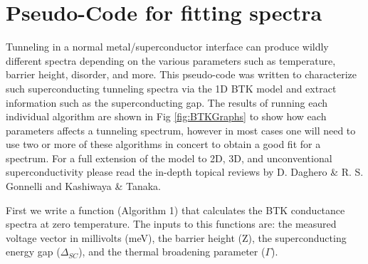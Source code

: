 \section{Pseudo-Code for fitting spectra}
Tunneling in a normal metal/superconductor interface can produce wildly different spectra depending on the various parameters such as temperature, barrier height, disorder, and more. This pseudo-code was written to characterize such superconducting tunneling spectra via the 1D \ac{BTK} model and extract information such as the superconducting gap. The results of running each individual algorithm are shown in Fig \ref{fig:BTKGraphs} to show how each parameters affects a tunneling spectrum, however in most cases one will need to use two or more of these algorithms in concert to obtain a good fit for a spectrum. For a full extension of the model to 2D, 3D, and unconventional superconductivity please read the in-depth topical reviews by D. Daghero \& R. S. Gonnelli\cite{Daghero2010} and Kashiwaya \& Tanaka\cite{Kashiwaya2000}.\par
First we write a function (Algorithm 1) that calculates the \ac{BTK} conductance spectra at zero temperature. The inputs to this functions are: the measured voltage vector in millivolts (meV), the barrier height (Z), the superconducting energy gap ($\Delta_{SC}$), and the thermal broadening parameter ($\Gamma$).
